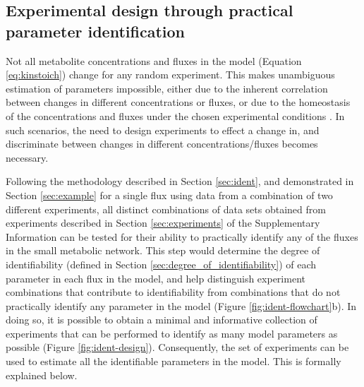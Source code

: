 \documentclass[10pt]{article}
\begin{document}
	\subsection{Experimental design through practical parameter identification}\label{sec:experimental_design}		
	Not all metabolite concentrations and fluxes in the model (Equation \ref{eq:kinstoich}) change for any random experiment. This makes unambiguous estimation of parameters impossible, either due to the inherent correlation between changes in different concentrations or fluxes, or due to the homeostasis of the concentrations and fluxes under the chosen experimental conditions \parencite{Heijnen2013}. In such scenarios, the need to design experiments to effect a change in, and discriminate between changes in different concentrations/fluxes becomes necessary. 
		
	Following the methodology described in Section \ref{sec:ident}, and demonstrated in Section \ref{sec:example} for a single flux using data from a combination of two different experiments, all distinct combinations of data sets obtained from experiments described in Section \ref{sec:experiments} of the Supplementary Information can be tested for their ability to practically identify any of the fluxes in the small metabolic network. This step would determine the degree of identifiability (defined in Section \ref{sec:degree_of_identifiability}) of each parameter in each flux in the model, and help distinguish experiment combinations that contribute to identifiability from combinations that do not practically identify any parameter in the model (Figure \ref{fig:ident-flowchart}b). In doing so, it is possible to obtain a minimal and informative collection of experiments that can be performed to identify as many model parameters as possible (Figure \ref{fig:ident-design}). Consequently, the set of experiments can be used to estimate all the identifiable parameters in the model. This is formally explained below.
	
\end{document}
